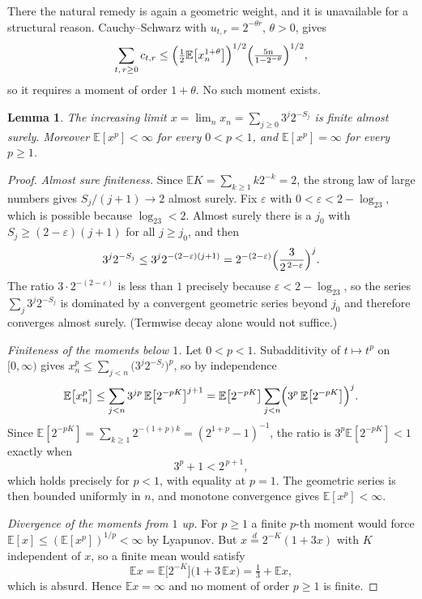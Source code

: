 \documentclass[11pt,reqno]{amsart}
\theoremstyle{plain}
\newtheorem{lemma}[theorem]{Lemma}
\theoremstyle{definition}
\theoremstyle{remark}
\newcommand{\E}{\mathbb{E}}
\begin{document}
There the natural remedy is again a geometric weight, and it is
unavailable for a structural reason. Cauchy--Schwarz with
$u_{t,r}=2^{-\theta r}$, $\theta>0$, gives
\[
\sum_{t,\,r\ge0}c_{t,r}
\le\Bigl(\tfrac12\E\bigl[x_n^{1+\theta}\bigr]\Bigr)^{1/2}
\Bigl(\tfrac{5n}{1-2^{-\theta}}\Bigr)^{1/2},
\]
so it requires a moment of order $1+\theta$. No such moment exists.

\begin{lemma}\label{lem:moment}
The increasing limit $x=\lim_nx_n=\sum_{j\ge0}3^j2^{-S_j}$ is finite almost
surely. Moreover $\E[x^p]<\infty$ for every $0<p<1$, and $\E[x^p]=\infty$
for every $p\ge1$.
\end{lemma}

\begin{proof}
\emph{Almost sure finiteness.} Since $\E K=\sum_{k\ge1}k2^{-k}=2$, the
strong law of large numbers gives $S_j/(j+1)\to2$ almost surely. Fix
$\varepsilon$ with $0<\varepsilon<2-\log_23$, which is possible because
$\log_23<2$. Almost surely there is a $j_0$ with
$S_j\ge(2-\varepsilon)(j+1)$ for all $j\ge j_0$, and then
\[
3^j2^{-S_j}\le3^j2^{-(2-\varepsilon)(j+1)}
=2^{-(2-\varepsilon)}\Bigl(\frac{3}{2^{\,2-\varepsilon}}\Bigr)^{j}.
\]
The ratio $3\cdot2^{-(2-\varepsilon)}$ is less than $1$ precisely because
$\varepsilon<2-\log_23$, so the series $\sum_j3^j2^{-S_j}$ is dominated by a
convergent geometric series beyond $j_0$ and therefore converges almost
surely. (Termwise decay alone would not suffice.)

\emph{Finiteness of the moments below $1$.}
Let $0<p<1$. Subadditivity of $t\mapsto t^p$ on $[0,\infty)$ gives
$x_n^p\le\sum_{j<n}\bigl(3^j2^{-S_j}\bigr)^p$, so by independence
\[
\E\bigl[x_n^p\bigr]
\le\sum_{j<n}3^{jp}\,\E\bigl[2^{-pK}\bigr]^{j+1}
=\E\bigl[2^{-pK}\bigr]\sum_{j<n}
\Bigl(3^p\,\E\bigl[2^{-pK}\bigr]\Bigr)^{j}.
\]
Since $\E[2^{-pK}]=\sum_{k\ge1}2^{-(1+p)k}=(2^{1+p}-1)^{-1}$, the ratio is
$3^p\E[2^{-pK}]<1$ exactly when
\begin{equation}
3^p+1<2^{\,p+1},
\label{eq:moment}
\end{equation}
which holds precisely for $p<1$, with equality at $p=1$. The geometric
series is then bounded uniformly in $n$, and monotone convergence gives
$\E[x^p]<\infty$.

\emph{Divergence of the moments from $1$ up.}
For $p\ge1$ a finite $p$-th moment would force $\E[x]\le(\E[x^p])^{1/p}
<\infty$ by Lyapunov. But $x\overset{d}{=}2^{-K}(1+3x)$ with $K$
independent of $x$, so a finite mean would satisfy
\[
\E x=\E\bigl[2^{-K}\bigr]\bigl(1+3\,\E x\bigr)
=\tfrac13+\E x,
\]
which is absurd. Hence $\E x=\infty$ and no moment of order $p\ge1$ is
finite.
\end{proof}
\end{document}
